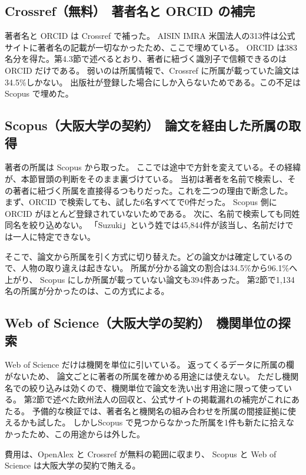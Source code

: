 \documentclass[a4paper,10pt]{ltjsarticle}
\begin{document}
\subsection{Crossref（無料）　著者名と ORCID の補完}

著者名と ORCID は Crossref で補った。
AISIN IMRA 米国法人の313件は公式サイトに著者名の記載が一切なかったため、ここで埋めている。
ORCID は383名分を得た。第4.3節で述べるとおり、著者に紐づく識別子で信頼できるのは ORCID だけである。
弱いのは所属情報で、Crossref に所属が載っていた論文は34.5\%しかない。
出版社が登録した場合にしか入らないためである。この不足は Scopus で埋めた。

\subsection{Scopus（大阪大学の契約）　論文を経由した所属の取得}

著者の所属は Scopus から取った。
ここでは途中で方針を変えている。その経緯が、本節冒頭の判断をそのまま裏づけている。
当初は著者を名前で検索し、その著者に紐づく所属を直接得るつもりだった。これを二つの理由で断念した。
まず、ORCID で検索しても、試した6名すべてで0件だった。
Scopus 側に ORCID がほとんど登録されていないためである。
次に、名前で検索しても同姓同名を絞り込めない。
「Suzuki」という姓では45,844件が該当し、名前だけでは一人に特定できない。

そこで、論文から所属を引く方式に切り替えた。どの論文かは確定しているので、人物の取り違えは起きない。
所属が分かる論文の割合は34.5\%から96.1\%へ上がり、
Scopus にしか所属が載っていない論文も394件あった。
第2節で1,134名の所属が分かったのは、この方式による。

\subsection{Web of Science（大阪大学の契約）　機関単位の探索}

Web of Science だけは機関を単位に引いている。
返ってくるデータに所属の欄がないため、
論文ごとに著者の所属を確かめる用途には使えない。
ただし機関名での絞り込みは効くので、機関単位で論文を洗い出す用途に限って使っている。
第2節で述べた欧州法人の回収と、公式サイトの掲載漏れの補完がこれにあたる。
予備的な検証では、著者名と機関名の組み合わせを所属の間接証拠に使えるかも試した。
しかしScopus で見つからなかった所属を1件も新たに拾えなかったため、この用途からは外した。

費用は、OpenAlex と Crossref が無料の範囲に収まり、
Scopus と Web of Science は大阪大学の契約で賄える。
\end{document}
